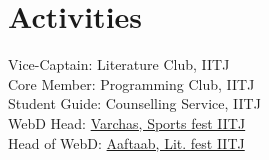 \documentclass[]{deedy-resume-openfont}
\begin{document}
\begin{minipage}[t]{0.33\textwidth}
\section{Activities} 
\textbullet{} Vice-Captain: Literature Club, IITJ\\
\textbullet{} Core Member: Programming Club, IITJ\\
\textbullet{} Student Guide: Counselling Service, IITJ\\
\textbullet{} WebD Head: \href{http://varchas2020.org/}{Varchas, Sports fest IITJ \faExternalLink}\\
\textbullet{} Head of WebD: \href{https://students.iitj.ac.in/aaftaab/}{Aaftaab, Lit. fest IITJ \faExternalLink} 

%
%

\end{minipage} 
\hfill
\end{document}
